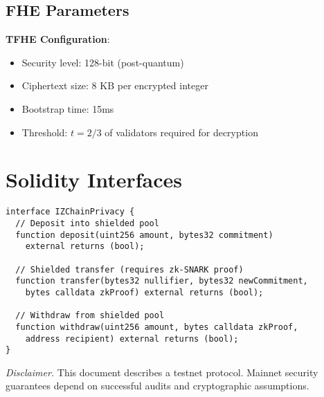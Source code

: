\documentclass[11pt]{article}
\begin{document}
\subsection{FHE Parameters}

\textbf{TFHE Configuration}:
\begin{itemize}[leftmargin=1.1em]
  \item Security level: 128-bit (post-quantum)
  \item Ciphertext size: 8 KB per encrypted integer
  \item Bootstrap time: 15ms
  \item Threshold: $t = 2/3$ of validators required for decryption
\end{itemize}

\section{Solidity Interfaces}

\begin{verbatim}
interface IZChainPrivacy {
  // Deposit into shielded pool
  function deposit(uint256 amount, bytes32 commitment)
    external returns (bool);

  // Shielded transfer (requires zk-SNARK proof)
  function transfer(bytes32 nullifier, bytes32 newCommitment,
    bytes calldata zkProof) external returns (bool);

  // Withdraw from shielded pool
  function withdraw(uint256 amount, bytes calldata zkProof,
    address recipient) external returns (bool);
}
\end{verbatim}

\vspace{1em}
\noindent\textit{Disclaimer.} This document describes a testnet protocol. Mainnet security guarantees depend on successful audits and cryptographic assumptions.
\end{document}
